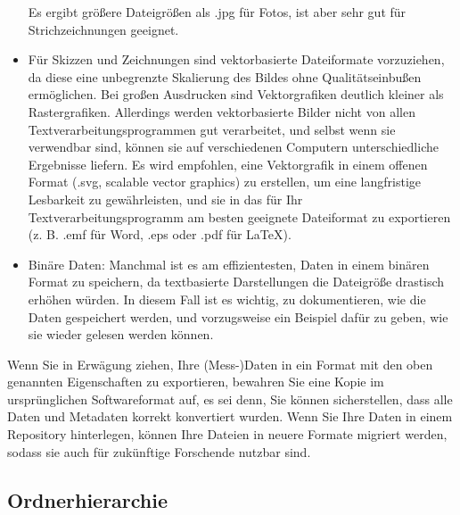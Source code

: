 \begin{itemize}
        Es ergibt größere Dateigrößen als .jpg für Fotos, ist aber sehr gut für
        Strichzeichnungen geeignet.
  \item Für Skizzen und Zeichnungen sind vektorbasierte Dateiformate
        vorzuziehen, da diese eine unbegrenzte Skalierung des Bildes ohne
        Qualitätseinbußen ermöglichen. Bei großen Ausdrucken sind
        Vektorgrafiken deutlich kleiner als Rastergrafiken. Allerdings werden
        vektorbasierte Bilder nicht von allen Textverarbeitungsprogrammen gut
        verarbeitet, und selbst wenn sie verwendbar sind, können sie auf
        verschiedenen Computern unterschiedliche Ergebnisse liefern. Es wird
        empfohlen, eine Vektorgrafik in einem offenen Format (.svg, scalable
        vector graphics) zu erstellen, um eine langfristige Lesbarkeit zu
        gewährleisten, und sie in das für Ihr Textverarbeitungsprogramm am
        besten geeignete Dateiformat zu exportieren (z. B. .emf für Word, .eps
        oder .pdf für LaTeX).
  \item Binäre Daten: Manchmal ist es am effizientesten, Daten in einem binären
        Format zu speichern, da textbasierte Darstellungen die Dateigröße
        drastisch erhöhen würden. In diesem Fall ist es wichtig, zu
        dokumentieren, wie die Daten gespeichert werden, und vorzugsweise ein
        Beispiel dafür zu geben, wie sie wieder gelesen werden können.
\end{itemize}

\noindent Wenn Sie in Erwägung ziehen, Ihre (Mess-)Daten in ein Format mit den
oben genannten Eigenschaften zu exportieren, bewahren Sie eine Kopie im
ursprünglichen Softwareformat auf, es sei denn, Sie können sicherstellen, dass
alle Daten und Metadaten korrekt konvertiert wurden. Wenn Sie Ihre Daten in
einem Repository hinterlegen, können Ihre Dateien in neuere Formate migriert
werden, sodass sie auch für zukünftige Forschende nutzbar sind.

\subsection{Ordnerhierarchie}

